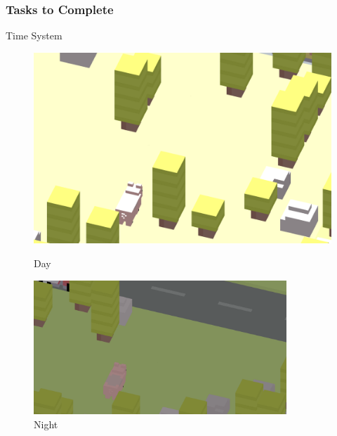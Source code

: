\documentclass[13.5pt,aspecratio=169, xcolor=dvipsnames]{beamer}
\begin{document}
\begin{frame}
       
    
    \end{frame}
        
    
    \begin{frame}
        \onehalfspacing
        \frametitle{Tasks to Complete}
         {
            \begin{minipage}{0.25\textwidth}
                \begin{block}{}
                    \centering
                    Time System
                \end{block}
            \end{minipage}
    
            \begin{figure}[h]
                \begin{minipage}{0.4\textwidth}
                    \centering
                    \includegraphics[height=0.4\textheight, width=\textwidth]{time_system_day.png}
                    \caption{Day}
                \end{minipage}
                \begin{minipage}{0.5\textwidth}
                    \centering
                    \includegraphics[height=0.4\textheight, width=0.85\textwidth]{time_system_night.png}
                    \caption{Night}
                \end{minipage}
            \end{figure}
        }
    

\end{frame}
\end{document}

